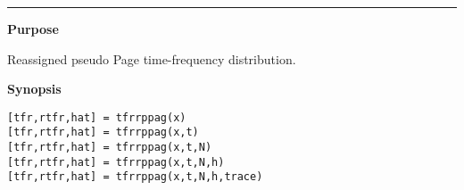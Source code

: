 

\hspace*{-1.6cm}{\Large \bf tfrrppag}

\vspace*{-.4cm}
\hspace*{-1.6cm}\rule[0in]{16.5cm}{.02cm}
\vspace*{.2cm}

{\bf \large {}\selectfont Purpose}\\
\hspace*{1.5cm}
\begin{minipage}[t]{13.5cm}
Reassigned pseudo Page time-frequency distribution.
\end{minipage}
\vspace*{.5cm}

{\bf \large {}\selectfont Synopsis}\\
\hspace*{1.5cm}
\begin{minipage}[t]{13.5cm}
\begin{verbatim}
[tfr,rtfr,hat] = tfrrppag(x)
[tfr,rtfr,hat] = tfrrppag(x,t)
[tfr,rtfr,hat] = tfrrppag(x,t,N)
[tfr,rtfr,hat] = tfrrppag(x,t,N,h)
[tfr,rtfr,hat] = tfrrppag(x,t,N,h,trace)
\end{verbatim}
\end{minipage}
\vspace*{.5cm}


